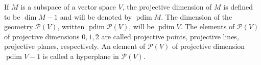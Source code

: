 If $M$ is a subspace of a vector space $V$, the projective dimension of $M$ is defined to be $\dim M - 1$ and will be denoted by $\operatorname{pdim} M$. The dimension of the geometry $\mathcal{P}(V)$, written $\operatorname{pdim} \mathcal{P}(V)$, will be $\operatorname{pdim} V$. The elements of $\mathcal{P}(V)$ of projective dimensions $0, 1, 2$ are called projective points, projective lines, projective planes, respectively. An element of $\mathcal{P}(V)$ of projective dimension $\operatorname{pdim} V - 1$ is called a hyperplane in $\mathcal{P}(V)$.
